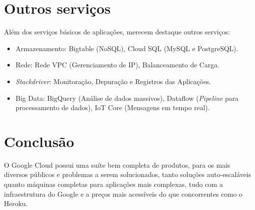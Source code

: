 \section{Outros serviços}

Além dos serviços básicos de aplicações, merecem destaque outros serviços:

\begin{itemize}
  \item Armazenamento: Bigtable (NoSQL), Cloud SQL (MySQL e PostgreSQL).
  \item Rede: Rede VPC (Gerenciamento de IP), Balanceamento de Carga.
  \item \textit{Stackdriver}: Monitoração, Depuração e Registros das Aplicações.
  \item Big Data: BigQuery (Análise de dados massivos), Dataflow (\textit{Pipeline} para processamento de dados), IoT Core (Mensagens em tempo real).
\end{itemize}

\section{Conclusão}

O Google Cloud possui uma suíte bem completa de produtos, para os mais diversos públicos e problemas a serem solucionados, tanto soluções auto-escaláveis quanto máquinas completas para aplicações mais complexas, tudo com a infraestrutura do Google e a preços mais acessíveis do que concorrentes como o Heroku.
